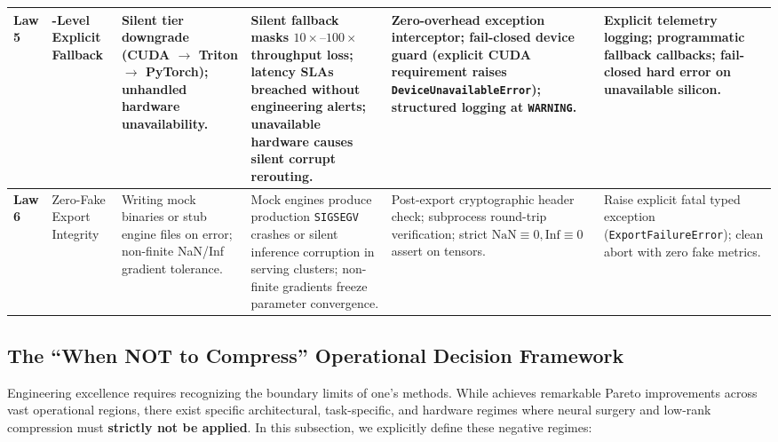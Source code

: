 \begin{table}[t]
\begin{tabularx}{\textwidth}{@{}l >{\raggedright\arraybackslash}p{2.2cm} >{\raggedright\arraybackslash}p{2.6cm} >{\raggedright\arraybackslash}p{3.4cm} >{\raggedright\arraybackslash}p{2.8cm} >{\raggedright\arraybackslash}X@{}}
\midrule
\textbf{Law 5} & 3-Level Explicit Fallback & Silent tier downgrade (CUDA $\to$ Triton $\to$ PyTorch); unhandled hardware unavailability. & Silent fallback masks $10\times\text{--}100\times$ throughput loss; latency SLAs breached without engineering alerts; unavailable hardware causes silent corrupt rerouting. & Zero-overhead exception interceptor; fail-closed device guard (explicit CUDA requirement raises \texttt{DeviceUnavailableError}); structured logging at \texttt{WARNING}. & Explicit telemetry logging; programmatic fallback callbacks; fail-closed hard error on unavailable silicon. \\
\midrule
\textbf{Law 6} & Zero-Fake Export Integrity & Writing mock binaries or stub engine files on error; non-finite NaN/Inf gradient tolerance. & Mock engines produce production \texttt{SIGSEGV} crashes or silent inference corruption in serving clusters; non-finite gradients freeze parameter convergence. & Post-export cryptographic header check; subprocess round-trip verification; strict $\mathrm{NaN}\equiv 0, \mathrm{Inf}\equiv 0$ assert on tensors. & Raise explicit fatal typed exception (\texttt{ExportFailureError}); clean abort with zero fake metrics. \\
\bottomrule
\end{tabularx}
\end{table}

\subsection{The ``When NOT to Compress'' Operational Decision Framework}
\label{sec:when_not_to_compress}

Engineering excellence requires recognizing the boundary limits of one's methods. While \neuralops{} achieves remarkable Pareto improvements across vast operational regions, there exist specific architectural, task-specific, and hardware regimes where neural surgery and low-rank compression must \textbf{strictly not be applied}. In this subsection, we explicitly define these negative regimes:


